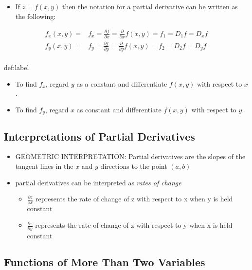 \documentclass{package/notes}
\begin{document}
\begin{itemize}
	\item If $z = f(x,y)$ then the notation for a partial derivative can be written as the following:
\end{itemize}

$$
\begin{aligned}
	f_x(x,y) =& f_x = \frac{\partial f}{\partial x} = \frac{\partial}{\partial x}f(x,y)=f_1=D_1f=D_xf\\
	f_y(x,y) =& f_y = \frac{\partial f}{\partial y} = \frac{\partial}{\partial y}f(x,y)=f_2=D_2f=D_yf\\
\end{aligned}
$$

\begin{proposition}{def:label}
	\begin{itemize}
		\item To find $f_x$, regard $y$ as a constant and differentiate $f(x,y)$ with respect to $x$.
		\item To find $f_y$, regard $x$ as constant and differentiate $f(x,y)$ with respect to $y$.
	\end{itemize}
\end{proposition}


\subsection{Interpretations of Partial Derivatives}

\begin{itemize}
	\item GEOMETRIC INTERPRETATION: Partial derivatives are the slopes of the tangent lines in the $x$ and $y$ directions to the point $(a,b)$ 
	\item partial derivatives can be interpreted as \textit{rates of change}
	\begin{itemize}
		\item $\frac{\partial z}{\partial x}$ represents the rate of change of z with respect to x when y is held constant
		\item $\frac{\partial z}{\partial y}$ represents the rate of change of z with respect to y when x is held constant
	\end{itemize}
\end{itemize}


\subsection{Functions of More Than Two Variables}
\end{document}
